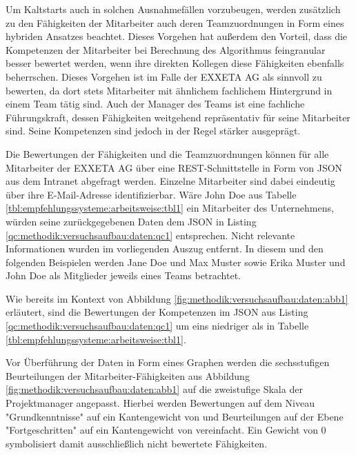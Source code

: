 Um Kaltstarts auch in solchen Ausnahmefällen vorzubeugen, werden zusätzlich zu den Fähigkeiten der Mitarbeiter auch deren Teamzuordnungen in Form eines hybriden Ansatzes beachtet. Dieses Vorgehen hat außerdem den Vorteil, dass die Kompetenzen der Mitarbeiter bei Berechnung des Algorithmus feingranular besser bewertet werden, wenn ihre direkten Kollegen diese Fähigkeiten ebenfalls beherrschen. Dieses Vorgehen ist im Falle der EXXETA AG als sinnvoll zu bewerten, da dort stets Mitarbeiter mit ähnlichem fachlichem Hintergrund in einem Team tätig sind. Auch der Manager des Teams ist eine fachliche Führungskraft, dessen Fähigkeiten weitgehend repräsentativ für seine Mitarbeiter sind. Seine Kompetenzen sind jedoch in der Regel stärker ausgeprägt.

Die Bewertungen der Fähigkeiten und die Teamzuordnungen können für alle Mitarbeiter der EXXETA AG über eine REST-Schnittstelle in Form von JSON aus dem Intranet abgefragt werden. Einzelne Mitarbeiter sind dabei eindeutig über ihre E-Mail-Adresse identifizierbar. Wäre John Doe aus Tabelle \ref{tbl:empfehlungssysteme:arbeitsweise:tbl1} ein Mitarbeiter des Unternehmens, würden seine zurückgegebenen Daten dem JSON in Listing \ref{qc:methodik:versuchsaufbau:daten:qc1} entsprechen. Nicht relevante Informationen wurden im vorliegenden Auszug entfernt. In diesem und den folgenden Beispielen werden Jane Doe und Max Muster sowie Erika Muster und John Doe als Mitglieder jeweils eines Teams betrachtet. 



Wie bereits im Kontext von Abbildung \ref{fig:methodik:versuchsaufbau:daten:abb1} erläutert, sind die Bewertungen der Kompetenzen im JSON aus Listing \ref{qc:methodik:versuchsaufbau:daten:qc1} um eins niedriger als in Tabelle \ref{tbl:empfehlungssysteme:arbeitsweise:tbl1}.

Vor Überführung der Daten in Form eines Graphen werden die sechsstufigen Beurteilungen der Mitarbeiter-Fähigkeiten aus Abbildung \ref{fig:methodik:versuchsaufbau:daten:abb1} auf die zweistufige Skala der Projektmanager angepasst. Hierbei werden Bewertungen auf dem Niveau "Grundkenntnisse" auf ein Kantengewicht von \kantengewichtString und Beurteilungen auf der Ebene "Fortgeschritten" auf ein Kantengewicht von \kantengewichtHochString vereinfacht. Ein Gewicht von 0 symbolisiert damit ausschließlich nicht bewertete Fähigkeiten.

